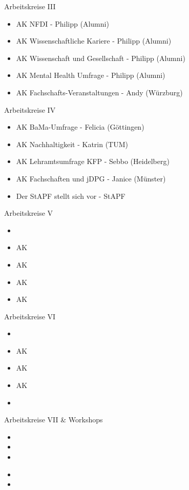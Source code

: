 \documentclass[compress, aspectratio=169]{beamer}
\begin{document}
	\begin{frame}{Arbeitskreise III}
		\begin{itemize}
			\item AK NFDI - Philipp (Alumni)
			\item AK Wissenschaftliche Kariere - Philipp (Alumni)
			\item AK Wissenschaft und Gesellschaft - Philipp (Alumni)
			\item AK Mental Health Umfrage - Philipp (Alumni)
			\item AK Fachschafts-Veranstaltungen - Andy (Würzburg)
		\end{itemize}
	\end{frame}
	
	\begin{frame}{Arbeitskreise IV}
		\begin{itemize}
			\item AK BaMa-Umfrage - Felicia (Göttingen)
			\item AK Nachhaltigkeit - 	Katrin (TUM)
			\item AK Lehramtsumfrage KFP - Sebbo (Heidelberg)
			\item AK Fachschaften und jDPG - Janice (Münster)
			\item Der StAPF stellt sich vor - StAPF
		\end{itemize}
	\end{frame}
	
	\begin{frame}{Arbeitskreise V}
		\begin{itemize}
			\item 
			\item AK 
			\item AK 
			\item AK 
			\item AK 
		\end{itemize}
	\end{frame}
	
	\begin{frame}{Arbeitskreise VI}
		\begin{itemize}
			\item 
			\item AK 
			\item AK 
			\item AK 
			\item 
		\end{itemize}
	\end{frame}
	
	\begin{frame}{Arbeitskreise VII \& Workshops}
		\begin{itemize}
			\item 
			\item 
			\item 
		\end{itemize}
		\vspace{.5cm}
		\begin{itemize}
			\item 
			\item 
		\end{itemize}
	\end{frame}
	
\end{document}
